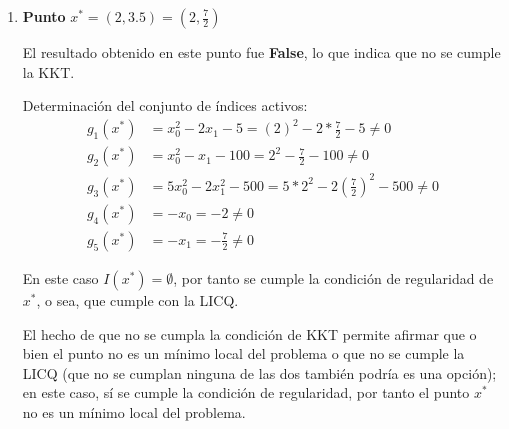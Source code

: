 \documentclass[titlepage, 11pt]{scrartcl}
\begin{document}
\begin{enumerate}
\begin{enumerate}
\begin{enumerate}
			Determinaci\'on del conjunto de \'indices activos:
			\begin{align*}
				g_1(x^*) &= x_0^2 - 2x_1 - 5 = (\frac{7}{10})^2 - 2* \frac{19}{5} - 5 \neq 0\\
				g_2(x^*) &= x_0^2 - x_1 - 100 = (\frac{7}{10})^2 - \frac{19}{5} - 100 \neq 0\\
				g_3(x^*) &= 5x_0^2 - 2 x_1^2 - 500 = 5 (\frac{7}{10})^2 - 2(\frac{19}{5})^2 - 500 \neq 0\\
				g_4(x^*) &= -x_0 = -\frac{7}{10} \neq 0\\
				g_5(x^*) &= -x_1 = -\frac{19}{5} \neq 0
			\end{align*}
			
			En este caso $I(x^*)  = \emptyset$, por tanto se cumple la condici\'on de regularidad de $x^*$, o sea, que cumple con la LICQ.
			
			El hecho de que no se cumpla la condición de KKT permite afirmar que o bien el punto no es un m\'inimo local del problema o que no se cumple la LICQ (que no se cumplan ninguna de las dos también podría es una opci\'on); en este caso, s\'i se cumple la condici\'on de regularidad, por tanto el punto $x^*$ no es un m\'inimo local del problema.
			
			\item \textbf{Punto} $x^* = (2, 3.5) = (2, \frac{7}{2})$
			
			El resultado obtenido en este punto fue \textbf{False}, lo que indica que no se cumple la KKT.
			
			Determinaci\'on del conjunto de \'indices activos:
			\begin{align*}
			g_1(x^*) &= x_0^2 - 2x_1 - 5 = (2)^2 - 2* \frac{7}{2} - 5 \neq 0\\
			g_2(x^*) &= x_0^2 - x_1 - 100 = 2^2 - \frac{7}{2} - 100 \neq 0\\
			g_3(x^*) &= 5x_0^2 - 2 x_1^2 - 500 = 5 * 2^2 - 2(\frac{7}{2})^2 - 500 \neq 0\\
			g_4(x^*) &= -x_0 = -2 \neq 0\\
			g_5(x^*) &= -x_1 = -\frac{7}{2} \neq 0
			\end{align*}
			
			En este caso $I(x^*)  = \emptyset$, por tanto se cumple la condici\'on de regularidad de $x^*$, o sea, que cumple con la LICQ.
			
			El hecho de que no se cumpla la condición de KKT permite afirmar que o bien el punto no es un m\'inimo local del problema o que no se cumple la LICQ (que no se cumplan ninguna de las dos también podría es una opci\'on); en este caso, s\'i se cumple la condici\'on de regularidad, por tanto el punto $x^*$ no es un m\'inimo local del problema.
			

\end{enumerate}
\end{enumerate}
\end{enumerate}
\end{document}
